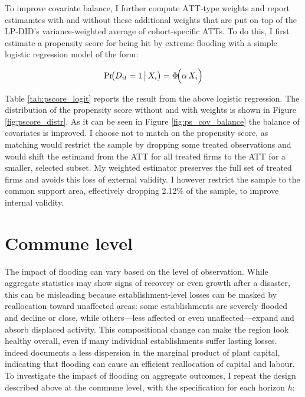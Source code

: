 To improve covariate balance, I further compute $\text{ATT}$‑type weights and report estimamtes with and without these additional weights that are put on top of the LP-DID's variance-weighted average of cohort-specific ATTs. To do this, I first estimate a propensity score for being hit by extreme flooding with a simple logistic regression model of the form:

\begin{equation*}
\Pr\!\bigl(D_{it}=1 \,\big|\, X_i\bigr)=
\Phi\!\Bigl(\alpha\,X_{i}\Bigr)
\end{equation*}

Table \ref{tab:pscore_logit} reports the result from the above logistic regression. The distribution of the propensity score without and with weights is shown in Figure \ref{fig:pscore_distr}. As it can be seen in Figure \ref{fig:ps_cov_balance} the balance of covariates is improved. I choose not to match on the propensity score, as matching would restrict the sample by dropping some treated observations and would shift the estimand from the ATT for all treated firms to the ATT for a smaller, selected subset. My weighted estimator preserves the full set of treated firms and avoids this loss of external validity. I however restrict the sample to the common support area, effectively dropping 2.12\% of the sample, to improve internal validity.


\section{Commune level}


The impact of flooding can vary based on the level of observation. While aggregate statistics may show signs of recovery or even growth after a disaster, this can be misleading because establishment‑level losses can be masked by reallocation toward unaffected areas: some establishments are severely flooded and decline or close, while others—less affected or even unaffected—expand and absorb displaced activity. This compositional change can make the region look healthy overall, even if many individual establishments suffer lasting losses. \cite{erda2024disasters} indeed documents a less dispersion in the marginal product of plant capital, indicating that flooding can cause an efficient reallocation of capital and labour. To investigate the impact of flooding on aggregate outcomes, I repeat the design described above at the commune level, with the specification for each horizon $h$:

